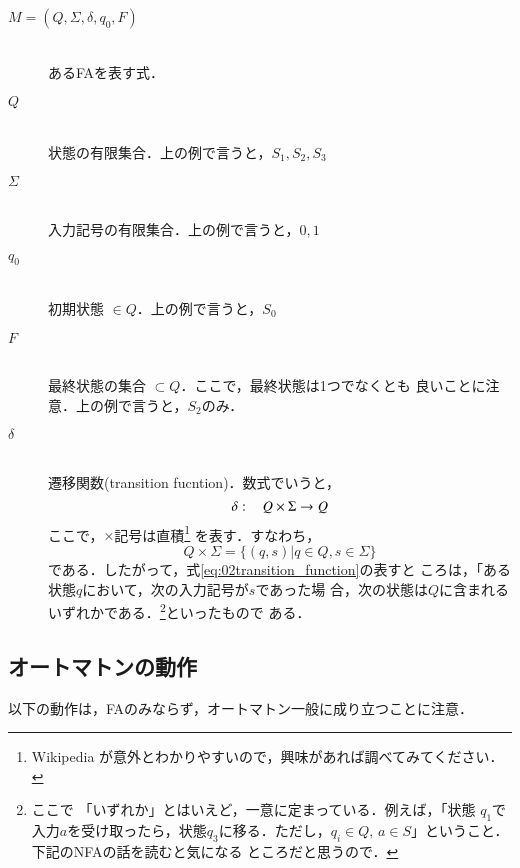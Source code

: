 \begin{description}
 \item[$M = (Q, \Sigma, \delta, q_0, F)$] \mbox{} \\
            あるFAを表す式．
            
 \item[$Q$] \mbox{} \\
            状態の有限集合．上の例で言うと，$S_1, S_2, S_3$
 \item[$\Sigma$] \mbox{} \\
            入力記号の有限集合．上の例で言うと，$0, 1$
 \item[$q_0$] \mbox{} \\
            初期状態 $\in Q$．上の例で言うと，$S_0$
 \item[$F$] \mbox{} \\
            最終状態の集合 $\subset Q$．ここで，最終状態は1つでなくとも
            良いことに注意．上の例で言うと，$S_2$のみ．
 \item[$\delta$] \mbox{} \\
            遷移関数(transition fucntion)．数式でいうと，
            \begin{equation}
             \delta : \hspace{2ex} Q \times \Sigma \rightarrow Q
              \label{eq:02transition_function}
            \end{equation}
            ここで，$\times$記号は直積\footnote{Wikipedia\cite{wikipedia}
            が意外とわかりやすいので，興味があれば調べてみてください．}
            を表す．すなわち，
            \[
             Q \times \Sigma = \{(q, s) | q \in Q, s \in \Sigma\}
            \]
            である．したがって，式\ref{eq:02transition_function}の表すと
            ころは，「ある状態$q$において，次の入力記号が$s$であった場
            合，次の状態は$Q$に含まれるいずれかである．\footnote{ここで
            「いずれか」とはいえど，一意に定まっている．例えば，「状態
            $q_1$で入力$a$を受け取ったら，状態$q_3$に移る．ただし，$q_i
            \in Q, \, a \in S$」ということ．下記のNFAの話を読むと気になる
            ところだと思うので．}といったもので
            ある．
\end{description}

\subsection{オートマトンの動作} \label{オートマトンの動作}
以下の動作は，FAのみならず，オートマトン一般に成り立つことに注意．

